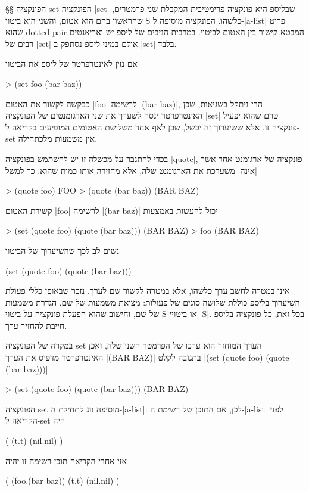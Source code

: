 §§ הפונקציה set
הפונקציה \T|set| שבליספ היא פונקציה פרימטיבית המקבלת שני פרמטרים, שהראשון בהם
הוא אטום, והשני הוא ביטוי S כלשהו. הפונקציה מוסיפה ל-\E|a-list| פריט שהוא
dotted-pair
המבטא קישור בין האטום לביטוי. במרבית הניבים של ליספ יש ואריאנטים רבים של
\T|set| אולם במיני-ליספ נסתפק ב-\T|set| בלבד.

אם נזין לאינטרפרטר של ליספ את הביטוי
\begin{LISP}
> (set foo (bar baz))
\end{LISP}
כבקשה לקשור את האטום \T|foo| לרשימה \T|(bar baz)|, הרי ניתקל בשגיאות, שכן
האינטרפרטר ינסה לשערך את שני הארגומנטים של הפונקציה \E|set| טרם שהוא יפעיל
פונקציה זו. אלא ששיערוך זה יכשל, שכן לאף אחד משלושת האטומים המופיעים בקריאה
ל-set אין משמעות מלכתחילה.

בכדי להתגבר על מכשלה זו יש להשתמש בפונקציה \T|quote|, פונקציה של ארגומנט אחד
אשר \ע|אינה| משערכת את הארגומנט שלה, אלא מחזירה אותו כמות שהוא.
כך למשל
\begin{LISP}
> (quote foo)
FOO
> (quote (bar baz))
(BAR BAZ)
\end{LISP}
קשירת האטום \T|foo| לרשימה \T|(bar baz)| יכול להעשות באמצעות
\begin{LISP}
> (set (quote foo) (quote (bar baz)))
(BAR BAZ)
> foo
(BAR BAZ)
\end{LISP}
נשים לב לכך שהשיערוך של הביטוי
\begin{LISP}
(set (quote foo) (quote (bar baz)))
\end{LISP}
אינו במטרה לחשב ערך כלשהו, אלא במטרה לקשור שם לערך. נזכר שבאופן כללי פעולת
השיערוך בליספ כוללת שלושה סוגים של פעולות: מציאת משמעות של שם, הגדרת
משמעות של שם, וחישוב שהוא הפעלת פונקציה על ביטוי S או ביטויי \E|S|.
בכל זאת, כל פונקציה בליספ חייבת להחזיר ערך.

במקרה של הפונקציה set הערך המוחזר הוא ערכו של הפרמטר השני שלה, ואכן האינטרפרטר
מדפיס את הערך \T|(BAR BAZ)| בתגובה לקלט \T|(set (quote foo) (quote (bar
baz)))|.

\begin{LISP}
> (set (quote foo) (quote (bar baz)))
(BAR BAZ)
\end{LISP}

הפונקציה set מוסיפה זוג לתחילת ה-\E|a-list|: לכן, אם התוכן של רשימת ה-\E|a-list|
לפני הקריאה ל-set היה
\begin{LISP}
(
  (t.t)
  (nil.nil)
)
\end{LISP}

\minipage\textwidth
אזי אחרי הקריאה תוכן רשימה זו יהיה
\begin{LISP}
(
  (foo.(bar baz))
  (t.t)
  (nil.nil)
)
\end{LISP}
\endminipage

